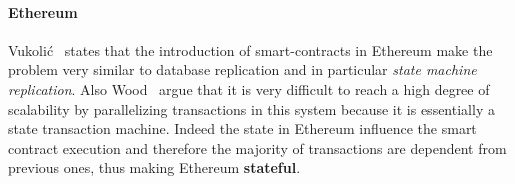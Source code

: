 \paragraph{Ethereum} Vukoli\'c~\cite{bib:the-quest} states that the introduction of
smart-contracts 
in Ethereum make the problem very similar to database replication and in 
particular \emph{state machine replication}. Also Wood~\cite{wood2018ethereum}
argue that it is very difficult to reach a high degree of scalability by
parallelizing transactions in this system because it is essentially a state
transaction machine.
Indeed the state in Ethereum influence the smart contract execution and
therefore the majority of transactions are dependent from previous ones, thus
making Ethereum \textbf{stateful}.



